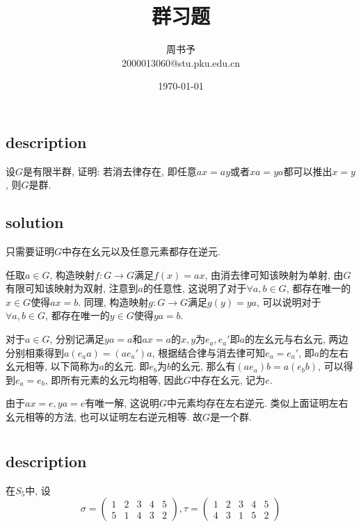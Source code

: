 \documentclass[UTF-8]{ctexart}
\title{\heiti\zihao{1} 群习题}
\author{\kaishu\zihao{-3} 周书予\\2000013060@stu.pku.edu.cn}
\date{\today}
\begin{document}
\maketitle

\section{}
\subsection{description}
设$G$是有限半群, 证明: 若消去律存在, 即任意$ax = ay$或者$xa = ya$都可以推出$x = y$, 则$G$是群.
\subsection{solution}
只需要证明$G$中存在幺元以及任意元素都存在逆元.

任取$a \in G$, 构造映射$f: G \to G$满足$f(x) = ax$, 由消去律可知该映射为单射, 由$G$有限可知该映射为双射, 注意到$a$的任意性, 这说明了对于$\forall a, b \in G$, 都存在唯一的$x \in G$使得$ax = b$. 同理, 构造映射$g: G \to G$满足$g(y) = ya$, 可以说明对于$\forall a, b \in G$, 都存在唯一的$y \in G$使得$ya = b$.

对于$a \in G$, 分别记满足$ya = a$和$ax = a$的$x, y$为$e_a, e_a'$即$a$的左幺元与右幺元, 两边分别相乘得到$a(e_aa) = (ae_a')a$, 根据结合律与消去律可知$e_a = e_a'$, 即$a$的左右幺元相等, 以下简称为$a$的幺元. 即$e_b$为$b$的幺元, 那么有$(ae_a)b = a(e_bb)$, 可以得到$e_a = e_b$, 即所有元素的幺元均相等, 因此$G$中存在幺元, 记为$e$.

由于$ax = e, ya = e$有唯一解, 这说明$G$中元素均存在左右逆元. 类似上面证明左右幺元相等的方法, 也可以证明左右逆元相等. 故$G$是一个群.

\section{}
\subsection{description}
在$S_5$中, 设
$$\sigma = \begin{pmatrix}
1 & 2 & 3 & 4 & 5\\
5 & 1 & 4 & 3 & 2
\end{pmatrix}, 
\tau = \begin{pmatrix}
1 & 2 & 3 & 4 & 5\\
4 & 3 & 1 & 5 & 2
\end{pmatrix}$$
\end{document}
